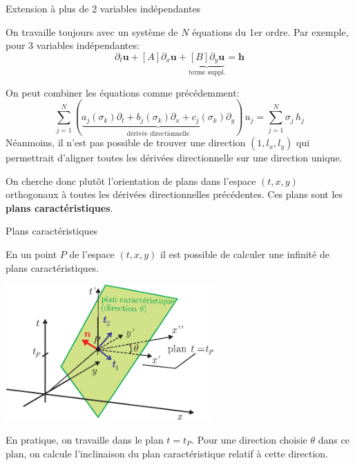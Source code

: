 \documentclass[
mode=present,    %
paper=a4paper,   %
orient=landscape,
display=slides,   %
size=10pt,
style=romain   %
]{powerdot}
\begin{document}
\begin{slide}[toc=Extension]{Extension à plus de 2 variables indépendantes}

On travaille toujours avec un système de $N$ équations du 1er ordre. Par exemple, pour 3 variables indépendantes:
\begin{equation*}
\partial_t \boldsymbol{u} + [A] \partial_x \boldsymbol{u} + \underbrace{[B] \partial_y \boldsymbol{u}}_{\text{terme suppl.}} = \boldsymbol{h}
\end{equation*}

On peut combiner les équations comme précédemment:
\begin{equation*}
\sum_{j=1}^N \left( \underbrace{a_j(\sigma_k) \partial_t + b_j(\sigma_k) \partial_x + c_j(\sigma_k) \partial_y}_{\text{dérivée directionnelle}} \right)\, u_j = \sum_{j=1}^N \sigma_j\, h_j
\end{equation*}
Néanmoins, il n'est pas possible de trouver une direction $(1,l_x,l_y)$ qui permettrait d'aligner toutes les dérivées directionnelle sur une direction unique.

\bigskip

On cherche donc plutôt l'orientation de plans dans l'espace $(t,x,y)$ orthogonaux à toutes les dérivées directionnelles précédentes. Ces plans sont les \textbf{plans caractéristiques}.

\end{slide}


\begin{slide}[toc=Plans caractéristiques]{Plans caractéristiques}

En un point $P$ de l'espace $(t,x,y)$ il est possible de calculer une infinité de plans caractéristiques.

    \centerline{\includegraphics[width=0.6\textwidth]{plancarac.eps} }

En pratique, on travaille dans le plan $t=t_P$. Pour une direction choisie $\theta$ dans ce plan, on calcule l'inclinaison du plan caractéristique relatif à cette direction.

\end{slide}
\end{document}
